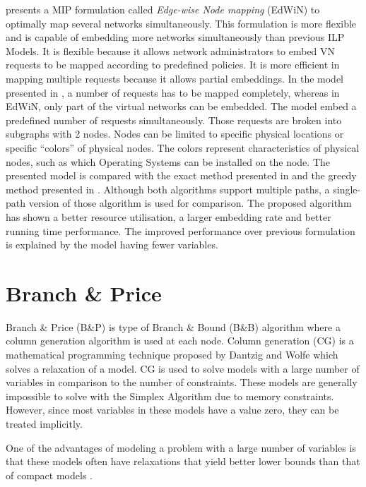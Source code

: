 \citet{Guerzoni:2014} presents a MIP formulation called \emph{Edge-wise Node mapping} (EdWiN) to optimally map several networks simultaneously.
This formulation is more flexible and is capable of embedding more networks simultaneously than previous ILP Models.
It is flexible because it allows network administrators to embed VN requests to be mapped according to predefined policies.
It is more efficient in mapping multiple requests because it allows partial embeddings.
In the model presented in \cite{Houidi:2011}, a number of requests has to be mapped completely, whereas in EdWiN, only
part of the virtual networks can be embedded.
The model embed a predefined number of requests simultaneously. Those requests are broken into subgraphs with 2 nodes.
Nodes can be limited to specific physical locations or specific ``colors'' of physical nodes.
The colors represent characteristics of physical nodes, such as which Operating Systems can be installed on the node.
The presented model is compared with the exact method presented in \cite{Houidi:2011} and the greedy method presented in \cite{Yu2008}.
Although both algorithms support multiple paths, a single-path version of those algorithm is used for comparison.
The proposed algorithm has shown a better resource utilisation, a larger embedding rate and better running time performance.
The improved performance over previous formulation is explained by the model having fewer variables.

\section{Branch \& Price}
\label{sec:relbp}
Branch \& Price (B\&P) is type of Branch \& Bound (B\&B) algorithm where a column generation algorithm is used at each node. Column generation (CG) is a mathematical programming technique proposed by Dantzig and Wolfe \cite{Dantzig:1960} which solves a relaxation of a model.
CG is used to solve models with a large number of variables in comparison to the number of constraints. These models are generally impossible to solve with the Simplex Algorithm due to memory constraints. However, since most variables in these models have a value zero, they can be treated implicitly.

One of the advantages of modeling a problem with a large number of variables is that these models often have relaxations that yield better lower bounds than that of compact models \cite{Barnhart:1998}.

